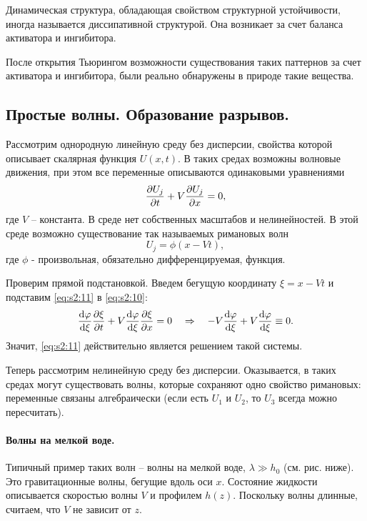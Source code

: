 Динамическая структура, обладающая свойством структурной устойчивости, иногда называется диссипативной структурой. Она возникает за счет баланса активатора и ингибитора. 

После открытия Тьюрингом возможности существования таких паттернов за счет активатора и ингибитора, были реально обнаружены в природе такие вещества.



\subsection{Простые волны. Образование разрывов.}
Рассмотрим однородную линейную среду без дисперсии, свойства которой описывает скалярная функция $U(x,t)$. В таких средах возможны волновые движения, при этом все переменные описываются одинаковыми уравнениями
\begin{equation}
	\pdv{U_j}{t}+V\pdv{U_j}{x}=0,
	\label{eq:s2:10}
\end{equation}
где $V$ -- константа. В среде нет собственных масштабов и нелинейностей. В этой среде возможно существование так называемых римановых волн
\begin{equation}
	U_j=\phi(x-Vt),
	\label{eq:s2:11}
\end{equation}
где $\phi$ - произвольная, обязательно дифференцируемая, функция.

Проверим прямой подстановкой. Введем бегущую координату $\xi=x-Vt$ и подставим \eqref{eq:s2:11} в \eqref{eq:s2:10}:
\begin{gather*}
	\dv{\varphi}{\xi} \pdv{\xi}{t}+V\dv{\varphi}{\xi} \pdv{\xi}{x}=0
	\quad\Rightarrow\quad
	-V\dv{\varphi}{\xi}+V \dv{\varphi}{\xi} \equiv 0.
\end{gather*}
Значит, \eqref{eq:s2:11} действительно является решением такой системы. 

Теперь рассмотрим нелинейную среду без дисперсии. Оказывается, в таких средах могут существовать волны, которые сохраняют одно свойство римановых:  переменные связаны алгебраически (если есть $U_1$ и $U_2$, то $U_3$ всегда можно пересчитать). 



\newpage
\paragraph{Волны на мелкой воде. } Типичный пример таких волн -- волны на мелкой воде, $\lambda \gg h_0$ (см. рис. ниже). Это гравитационные волны, бегущие вдоль оси $x$. 
Состояние жидкости описывается скоростью волны $V$  и профилем $h(z)$. Поскольку волны длинные, считаем, что $V$ не зависит от $z$.

